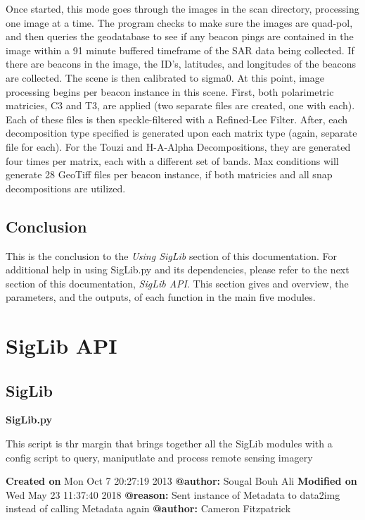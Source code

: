 \documentclass[letterpaper,10pt,openany,oneside]{sphinxmanual}
\begin{document}
Once started, this mode goes through the images in the scan directory, processing one image at a time. The program checks to make sure the images are quad-pol, and then queries the geodatabase to see if any beacon pings are contained in the image within a 91 minute buffered timeframe of the SAR data being collected. If there are beacons in the image, the ID's, latitudes, and longitudes of the beacons are collected. The scene is then calibrated to sigma0. At this point, image processing begins per beacon instance in this scene. First, both polarimetric matricies, C3 and T3, are applied (two separate files are created, one with each). Each of these files is then speckle-filtered with a Refined-Lee Filter. After, each decomposition type specified is generated upon each matrix type (again, separate file for each). For the Touzi and H-A-Alpha Decompositions, they are generated four times per matrix, each with a different set of bands. Max conditions will generate 28 GeoTiff files per beacon instance, if both matricies and all snap decompositions are utilized.


\section{Conclusion}
\label{tutorial:conclusion}
This is the conclusion to the \emph{Using SigLib} section of this documentation. For
additional help in using SigLib.py and its dependencies, please refer to the next section
of this documentation, \emph{SigLib API}. This section gives and overview, the parameters,
and the outputs, of each function in the main five modules.


\chapter{SigLib API}
\label{code:siglib-api}\label{code::doc}

\section{SigLib}
\label{code:module-SigLib}\label{code:siglib}
\textbf{SigLib.py}

This script is thr margin that brings together all the SigLib modules with a config script to query, maniputlate and process remote sensing imagery

\textbf{Created on} Mon Oct  7 20:27:19 2013 \textbf{@author:} Sougal Bouh Ali
\textbf{Modified on} Wed May  23 11:37:40 2018 \textbf{@reason:} Sent instance of Metadata to data2img instead of calling Metadata again \textbf{@author:} Cameron Fitzpatrick
\end{document}
